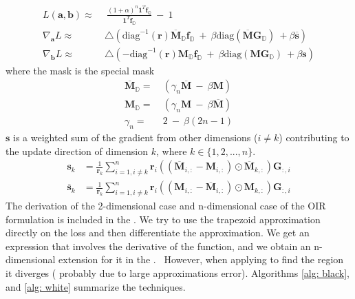 \begin{equation}
\begin{aligned} 
L(\mathbf{a},\mathbf{b})  \approx&~~ \frac{(1+\alpha)^{n} \mathbf{1}^{T}\mathbf{f}_{\mathbb{Q}}}{\mathbf{1}^{T}\mathbf{f}_{\mathbb{D}}} ~-~ 1\\ 
\nabla_{\mathbf{a}}L  \approx & ~\triangle  \left(\text{diag}^{-1}(\mathbf{r})\overline{\mathbf{M}}_{\mathbb{D}}\mathbf{f}_{\mathbb{D}} ~+~ \beta\text{diag}(\overline{\mathbf{M}}\mathbf{G}_{\mathbb{D}})~+ \beta \overline{\mathbf{s}}  \right)  \\
\nabla_{\mathbf{b}}L  \approx & ~\triangle  \left(- \text{diag}^{-1}(\mathbf{r})\mathbf{M}_{\mathbb{D}}\mathbf{f}_{\mathbb{D}} ~+~ \beta\text{diag}(\mathbf{M}\mathbf{G}_{\mathbb{D}})~+ \beta \mathbf{s}  \right)
\label{eq:n-loss-update-grad}
\end{aligned}
\end{equation}
where the mask is the special mask 
\begin{equation}
\begin{aligned} 
 \overline{\mathbf{M}}_{\mathbb{D}} =&~ \left( \gamma_n \overline{\mathbf{M}} ~-~\beta \mathbf{M}  \right) \\
  \mathbf{M}_{\mathbb{D}} =&~ \left( \gamma_n \mathbf{M} ~-~\beta \overline{\mathbf{M}}  \right) \\
  \gamma_n =&~ 2~-~\beta(2n-1) 
\label{eq:n-mask-grad}
\end{aligned}
\end{equation}
$\mathbf{s}$ is a weighted sum of the gradient from other dimensions ($i \neq k$) contributing to the update direction of dimension $k$, where $k \in \{1 , 2 ,...,n\}$.
\begin{equation}
\begin{aligned} 
\mathbf{s}_{k} &= \frac{1}{\mathbf{r}_{k}}\sum_{i=1, i\neq k }^{n}\mathbf{r}_{i}( (\overline{\mathbf{M}}_{i,:} - \mathbf{M}_{i,:})\odot \overline{\mathbf{M}}_{k,:} ) \mathbf{G}_{:,i} \\
\overline{\mathbf{s}}_{k} &= \frac{1}{\mathbf{r}_{k}}\sum_{i=1, i\neq k }^{n}\mathbf{r}_{i}( ( \mathbf{M}_{i,:} - \overline{\mathbf{M}}_{i,:} )\odot \mathbf{M}_{k,:} ) \mathbf{G}_{:,i}
\label{eq:n-update-grad-selection}
\end{aligned}
\end{equation}
The derivation of the 2-dimensional case and n-dimensional case of the OIR formulation is included in the \supp. We try to use the trapezoid approximation directly on the loss and then differentiate the approximation. We get  an expression that involves the derivative of the function, and we obtain an n-dimensional extension for it in the \supp.~ However, when applying to find the region it diverges ( probably due to large approximations error). Algorithms \ref{alg: black}, and \ref{alg: white} summarize the techniques.


